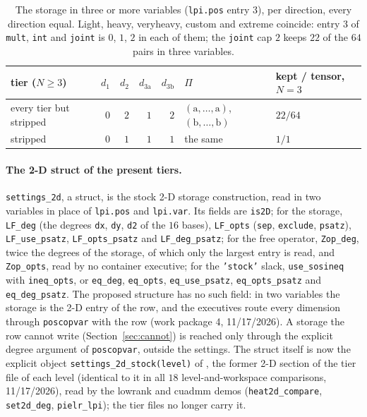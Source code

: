 \documentclass[12pt]{article}
\newcommand{\code}[1]{\texttt{#1}}
\newcommand{\file}[1]{\path{#1}}      %
\newcommand{\ba}{\mathrm{a}}
\newcommand{\bb}{\mathrm{b}}
\theoremstyle{plain}
\theoremstyle{definition}
\theoremstyle{remark}
\begin{document}
\begin{table}[h]\centering\footnotesize
\setlength{\tabcolsep}{6pt}
\begin{tabular}{lrrrrll}
\toprule
tier ($N\ge3$) & $d_1$ & $d_2$ & $d_{3\ba}$ & $d_{3\bb}$ & $\Pi$ & kept / tensor, $N=3$ \\
\midrule
every tier but stripped & $0$ & $2$ & $1$ & $2$ & $(\ba,\dots,\ba)$, $(\bb,\dots,\bb)$ & $22/64$ \\
stripped & $0$ & $1$ & $1$ & $1$ & the same & $1/1$ \\
\bottomrule
\end{tabular}
\caption{The storage in three or more variables (\code{lpi.pos} entry 3), per direction, every direction equal. Light, heavy, veryheavy, custom and extreme coincide: entry 3 of \code{mult}, \code{int} and \code{joint} is $0$, $1$, $2$ in each of them; the \code{joint} cap $2$ keeps $22$ of the $64$ pairs in three variables.}\label{tab:nd}
\end{table}

\paragraph{The 2-D struct of the present tiers.} \code{settings\_2d}, a struct, is the stock 2-D storage construction, read in two variables in place of \code{lpi.pos} and \code{lpi.var}. Its fields are \code{is2D}; for the storage, \code{LF\_deg} (the degrees \code{dx}, \code{dy}, \code{d2} of the $16$ bases), \code{LF\_opts} (\code{sep}, \code{exclude}, \code{psatz}), \code{LF\_use\_psatz}, \code{LF\_opts\_psatz} and \code{LF\_deg\_psatz}; for the free operator, \code{Zop\_deg}, twice the degrees of the storage, of which only the largest entry is read, and \code{Zop\_opts}, read by no container executive; for the \code{'stock'} slack, \code{use\_sosineq} with \code{ineq\_opts}, or \code{eq\_deg}, \code{eq\_opts}, \code{eq\_use\_psatz}, \code{eq\_opts\_psatz} and \code{eq\_deg\_psatz}. The proposed structure has no such field: in two variables the storage is the 2-D entry of the row, and the executives route every dimension through \code{poscopvar} with the row (work package 4, 11/17/2026). A storage the row cannot write (Section~\ref{sec:cannot}) is reached only through the explicit degree argument of \code{poscopvar}, outside the settings. The struct itself is now the explicit object \code{settings\_2d\_stock(level)} of \file{settings_sopvar/}, the former 2-D section of the tier file of each level (identical to it in all $18$ level-and-workspace comparisons, 11/17/2026), read by the lowrank and cuadmm demos (\code{heat2d\_compare}, \code{set2d\_deg}, \code{pielr\_lpi}); the tier files no longer carry it.
\end{document}
